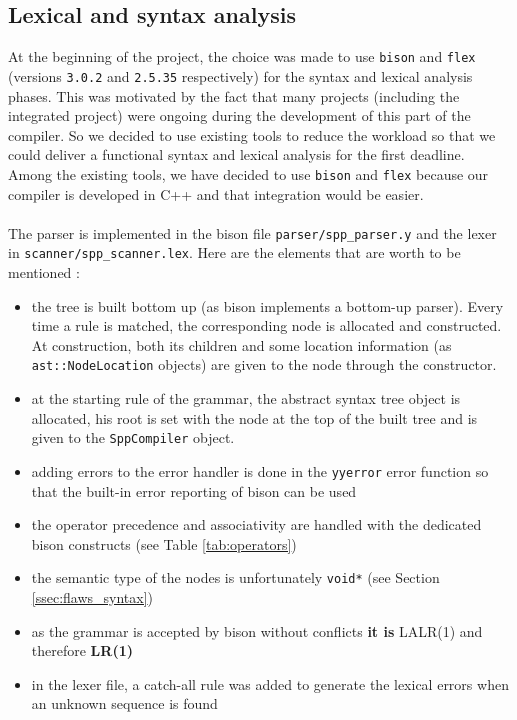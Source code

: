 \documentclass[a4paper,11pt]{article}
\begin{document}
\subsection{Lexical and syntax analysis}
\label{ssec:lex_synt}
At the beginning of the project, the choice was made to use \texttt{bison} and \texttt{flex} (versions \texttt{3.0.2} and \texttt{2.5.35} respectively) for the syntax and lexical analysis phases. This was motivated by the fact that many projects (including the integrated project) were ongoing during the development of this part of the compiler. So we decided to use existing tools to reduce the workload so that we could deliver a functional syntax and lexical analysis for the first deadline. Among the existing tools, we have decided to use \texttt{bison} and \texttt{flex} because our compiler is developed in C++ and that integration would be easier.
\\ \\
The parser is implemented in the bison file \texttt{parser/spp\_parser.y} and the lexer in \texttt{scanner/spp\_scanner.lex}. Here are the elements that are worth to be mentioned :
\begin{itemize}
	\item the tree is built bottom up (as bison implements a bottom-up parser). Every time a rule is matched, the corresponding node is allocated and constructed. At construction, both its children and some location information (as \texttt{ast::NodeLocation} objects) are given to the node through the constructor.
	\item at the starting rule of the grammar, the abstract syntax tree object is allocated, his root is set with the node at the top of the built tree and is given to the \texttt{SppCompiler} object.
	\item adding errors to the error handler is done in the \texttt{yyerror} error function so that the built-in error reporting of bison can be used
	\item the operator precedence and associativity are handled with the dedicated bison constructs (see Table \ref{tab:operators})
	\item the semantic type of the nodes is unfortunately \texttt{void*} (see Section \ref{ssec:flaws_syntax})
	\item as the grammar is accepted by bison without conflicts \textbf{it is} LALR(1) and therefore \textbf{LR(1)}
	\item in the lexer file, a catch-all rule was added to generate the lexical errors when an unknown sequence is found
\end{itemize}
\end{document}
